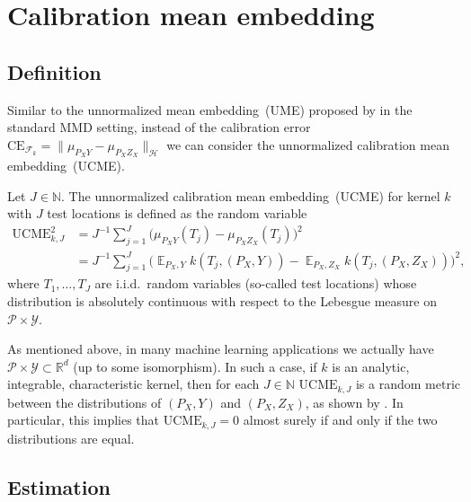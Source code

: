 \documentclass{article}
\DeclareMathOperator{\Exp}{\mathbb{E}}
\begin{document}
\section{Calibration mean embedding}
\label{app:ucme}

\subsection{Definition}

Similar to the unnormalized mean embedding~(UME) proposed by
\citet{Chwialkowski2015} in the standard MMD setting, instead of the
calibration error
$\mathrm{CE}_{\mathcal{F}_k} = \|\mu_{P_X Y} - \mu_{P_X Z_X}\|_{\mathcal{H}}$
we can consider the unnormalized calibration mean embedding~(UCME).

\begin{definition}\label{def:ucme}
Let $J \in \mathbb{N}$. The unnormalized calibration mean embedding~(UCME)
for kernel $k$ with $J$ test locations is defined
as the random variable
\begin{equation*}
    \begin{split}
        \mathrm{UCME}^2_{k,J} &= J^{-1} \sum_{j = 1}^J \big(\mu_{P_X Y}(T_j) - \mu_{P_X Z_X}(T_j)\big)^2 \\
        &= J^{-1} \sum_{j=1}^J \big(\Exp_{P_X,Y} k(T_j, (P_X, Y)) - \Exp_{P_X,Z_X} k(T_j, (P_X, Z_X))\big)^2,
    \end{split}
\end{equation*}
where $T_1, \ldots, T_J$ are i.i.d.\ random variables (so-called
test locations) whose distribution is absolutely continuous with
respect to the Lebesgue measure on $\mathcal{P} \times \mathcal{Y}$.
\end{definition}

As mentioned above, in many machine learning applications we actually
have $\mathcal{P} \times \mathcal{Y} \subset \mathbb{R}^d$ (up to
some isomorphism). In such a case, if $k$ is an analytic, integrable,
characteristic kernel, then for each $J \in \mathbb{N}$
$\mathrm{UCME}_{k,J}$ is a random metric between the distributions of
$(P_X, Y)$ and $(P_X, Z_X)$, as shown by
\citet[Theorem~2]{Chwialkowski2015}. In particular, this implies that
$\mathrm{UCME}_{k,J} = 0$ almost surely if and only if the two
distributions are equal.

\subsection{Estimation}
\end{document}
